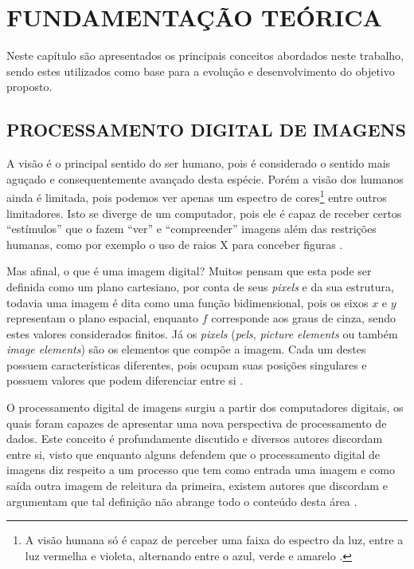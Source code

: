 
\chapter{FUNDAMENTAÇÃO TEÓRICA}
\label{chap:fundamentacao}
Neste capítulo são apresentados os principais conceitos abordados neste trabalho, sendo estes utilizados como base para a evolução e desenvolvimento do objetivo proposto.

\section{PROCESSAMENTO DIGITAL DE IMAGENS}
\label{sec:procimagens}

\par A visão é o principal sentido do ser humano, pois é considerado o sentido mais aguçado e consequentemente avançado desta espécie. Porém a visão dos humanos ainda é limitada, pois podemos ver apenas um espectro de cores\footnote{A visão humana só é capaz de perceber uma faixa do espectro da luz, entre a luz vermelha e violeta, alternando entre o azul, verde e amarelo \cite{Gonzalez2000}.} entre outros limitadores. Isto se diverge de um computador, pois ele é capaz de receber certos ``estímulos'' que o fazem ``ver'' e ``compreender'' imagens além das restrições humanas, como por exemplo o uso de raios X para conceber figuras \cite{Gonzalez2009}.
\par Mas afinal, o que é uma imagem digital? Muitos pensam que esta pode ser definida como um plano cartesiano, por conta de seus \textit{pixels} e da sua estrutura, todavia uma imagem é dita como uma função bidimensional, pois os eixos $x$ e $y$ representam o plano espacial, enquanto $f$ corresponde aos graus de cinza, sendo estes valores considerados finitos. Já os \textit{pixels} (\textit{pels}, \textit{picture elements} ou também \textit{image elements}) são os elementos que compõe a imagem. Cada um destes possuem características diferentes, pois ocupam suas posições singulares e possuem valores que podem diferenciar entre si \cite{Gonzalez2009}.

\par O processamento digital de imagens surgiu a partir dos computadores digitais, os quais foram capazes de apresentar uma nova perspectiva de processamento de dados. Este conceito é profundamente discutido e diversos autores discordam entre si, visto que enquanto alguns defendem que o processamento digital de imagens diz respeito a um processo que tem como entrada uma imagem e como saída outra imagem de releitura da primeira, existem autores que discordam e argumentam que tal definição não abrange todo o conteúdo desta área \cite{Gonzalez2009}.
 
